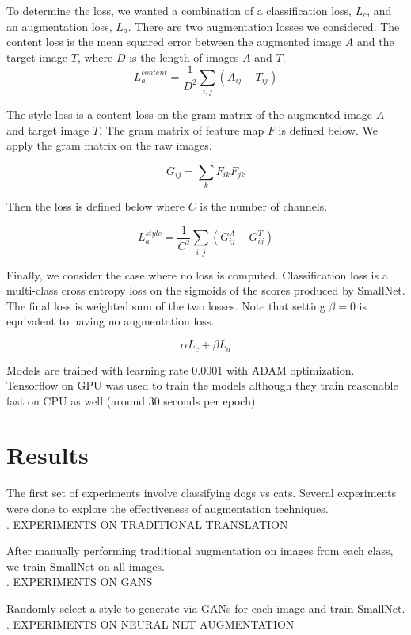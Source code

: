 \documentclass[10pt,twocolumn,letterpaper]{article}
\begin{document}
To determine the loss, we wanted a combination of a classification loss, $L_c$, and an augmentation loss, $L_a$. There are two augmentation losses we considered. The content loss is the mean squared error between the augmented image $A$ and the target image $T$, where $D$ is the length of images $A$ and $T$. 
\[ L_a^{content} = \frac{1}{D^2} \sum_{i,j}(A_{ij} - T_{ij})\]

The style loss is a content loss on the gram matrix of the augmented image $A$ and target image $T$. The gram matrix of feature map $F$ is defined below. We apply the gram matrix on the raw images. 

\[G_{ij}  = \sum_k F_{ik} F_{jk}\]

Then the loss is defined below where $C$ is the number of channels. 

\[L_a^{style} = \frac{1}{C^2} \sum_{i,j}(G_{ij}^A - G_{ij}^T)\]

Finally, we consider the case where no loss is computed. Classification loss is a multi-class cross entropy loss on the sigmoids of the scores produced by SmallNet. The final loss is weighted sum of the two losses. Note that setting $\beta =0$ is equivalent to having no augmentation loss. 

\[ \alpha L_c + \beta L_a\]

Models are trained with learning rate 0.0001 with ADAM optimization. Tensorflow on GPU was used to train the models although they train reasonable fast on CPU as well (around 30 seconds per epoch). 

\section{Results}

The first set of experiments involve classifying dogs vs cats. Several experiments were done to explore the effectiveness of augmentation techniques. \\

. EXPERIMENTS ON TRADITIONAL TRANSLATION

After manually performing traditional augmentation on images from each class, we train SmallNet on all images. \\

. EXPERIMENTS ON GANS 

Randomly select a style to generate via GANs for each image and train SmallNet. \\

. EXPERIMENTS ON  NEURAL NET AUGMENTATION 
\end{document}
